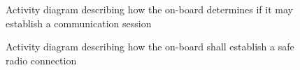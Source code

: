 \documentclass{template/openetcs_report}
\begin{document}
\begin{landscape}
\begin{figure}
  \centering
  \caption{Activity diagram describing how the on-board determines if it may establish a communication session}
  \label{fig:Determine_if_On-Board_shall_initiate_comm}
\end{figure}
\end{landscape}

\begin{figure}
  \centering
  \caption{Activity diagram describing how the on-board shall establish a safe radio connection}
  \label{fig:Safe_Radio_Connection}
\end{figure}
\end{document}
